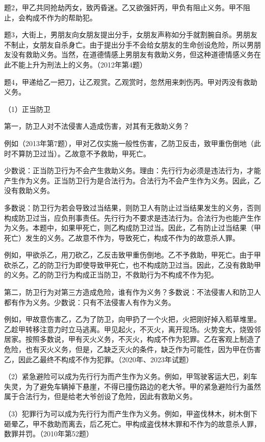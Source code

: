 题2，甲乙共同抢劫丙女，致丙昏迷。乙又欲强奸丙，甲负有阻止义务。甲不阻止，会构成不作为的帮助犯。

题3，大街上，男朋友向女朋友提出分手，女朋友声称如分手就割腕自杀。男朋友不制止，女朋友自杀身亡。由于提出分手不会给女朋友的生命创设危险，所以男朋友没有救助义务。当然，在道德情感上男朋友有救助义务，但这种道德情感义务在此不能上升为刑法上的义务。（2012年第4题）

题4，甲递给乙一把刀，让乙观赏。乙观赏时，忽然用来刺伤丙。甲对丙没有救助义务。

（1）正当防卫

第一，防卫人对不法侵害人造成伤害，对其有无救助义务？

例如（2013年第7题），甲对乙仅实施一般性伤害，乙防卫反击，致甲重伤倒地（此时不算防卫过当）。乙故意不予救助，甲死亡。

少数说：正当防卫行为不会产生救助义务。理由：先行行为必须是违法行为，才能产生作为义务。正当防卫行为是合法行为。合法行为不会产生作为义务。因此，乙没有救助义务。

多数说：防卫行为若会导致过当结果，则防卫人有防止过当结果发生的义务，否则构成防卫过当，应负刑事责任。先行行为不要求是违法行为。合法行为也能产生作为义务。本题中，如果甲死亡，则乙构成防卫过当。因此，乙有防止过当结果（甲死亡）发生的义务。乙故意不作为，导致死亡，构成不作为的故意杀人罪。

例如，甲欲杀乙，用刀砍乙，乙反击致甲重伤倒地。乙不予救助，甲死亡。由于甲砍杀乙，乙的防卫行为即使导致甲死亡，也不构成防卫过当。因此，乙没有救助甲的义务。乙的防卫行为构成正当防卫，不救助行为不构成不作为犯。

第二，防卫行为对第三方造成危险，谁有作为义务？多数说：不法侵害人和防卫人都有作为义务。少数说：只有不法侵害人有作为义务。

例如，甲故意伤害乙，乙为了防卫，向甲扔了一个火把，火把刚好掉入稻草堆里。乙趁甲转移注意力时立马逃离。甲见起火，不灭火，离开现场。火势变大，烧毁邻居家。按照多数说，甲有灭火义务，不灭火，构成不作为犯罪。乙在客观上制造了危险，也有灭火义务，但是，乙缺乏灭火的条件，缺乏作为可能性，因为甲在伤害乙，因此乙最终不构成不作为犯罪。（2020年、2023年试题）

（2）紧急避险可以成为先行行为而产生作为义务。例如，甲驾驶客运大巴，刹车失灵，为了避免车辆掉下悬崖，不得已撞伤路边的老大爷。甲的紧急避险行为虽然属于合法行为，但是给老大爷创设了危险，因此有救助义务。

（3）犯罪行为可以成为先行行为而产生作为义务。例如，甲盗伐林木，树木倒下砸晕乙，甲不救助而离去，后乙死亡。甲构成盗伐林木罪和不作为的故意杀人罪，数罪并罚。（2010年第52题）

